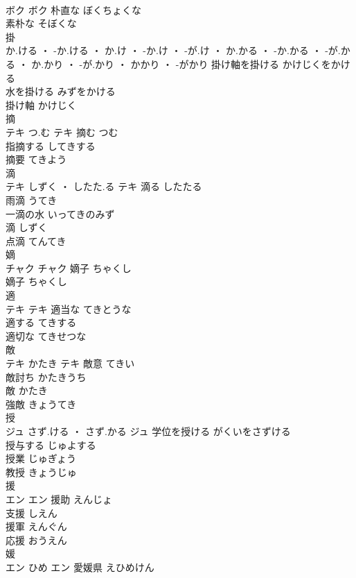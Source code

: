 \documentclass[8pt]{extreport}
\begin{document}
\begin{CJK}{UTF8}{min}
\\	ボク		ボク	朴直な	ぼくちょくな	
\\	素朴な	そぼくな	
\\	掛	
\\	か.ける ・ -か.ける ・ か.け ・ -か.け ・ -が.け ・ か.かる ・ -か.かる ・ -が.かる ・ か.かり ・ -が.かり ・ かかり ・ -がかり		掛け軸を掛ける	かけじくをかける	
\\	水を掛ける	みずをかける	
\\	掛け軸	かけじく	
\\	摘	
\\	テキ	つ.む	テキ	摘む	つむ	
\\	指摘する	してきする	
\\	摘要	てきよう	
\\	滴	
\\	テキ	しずく ・ したた.る	テキ	滴る	したたる	
\\	雨滴	うてき	
\\	一滴の水	いってきのみず	
\\	滴	しずく	
\\	点滴	てんてき	
\\	嫡	
\\	チャク		チャク	嫡子	ちゃくし	
\\	嫡子	ちゃくし	
\\	適	
\\	テキ		テキ	適当な	てきとうな	
\\	適する	てきする	
\\	適切な	てきせつな	
\\	敵	
\\	テキ	かたき	テキ	敵意	てきい	
\\	敵討ち	かたきうち	
\\	敵	かたき	
\\	強敵	きょうてき	
\\	授	
\\	ジュ	さず.ける ・ さず.かる	ジュ	学位を授ける	がくいをさずける	
\\	授与する	じゅよする	
\\	授業	じゅぎょう	
\\	教授	きょうじゅ	
\\	援	
\\	エン		エン	援助	えんじょ	
\\	支援	しえん	
\\	援軍	えんぐん	
\\	応援	おうえん	
\\	媛	
\\	エン	ひめ	エン													愛媛県	えひめけん	

\end{CJK}
\end{document}
